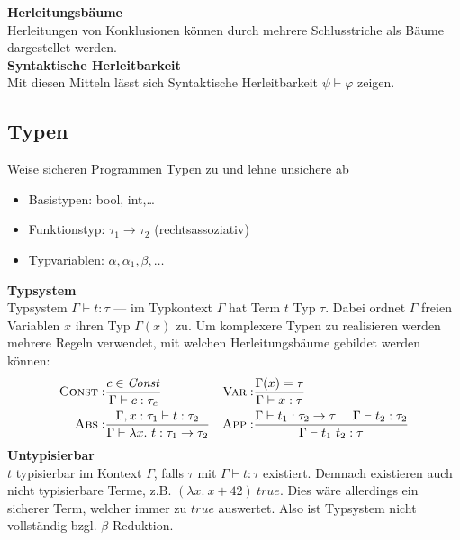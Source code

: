 \textbf{Herleitungsbäume}\\
Herleitungen von Konklusionen können durch mehrere Schlusstriche als Bäume dargestellet werden.\\

\textbf{Syntaktische Herleitbarkeit}\\
Mit diesen Mitteln lässt sich Syntaktische Herleitbarkeit \(\psi \vdash \varphi\) zeigen.

\subsection{Typen}%
\label{tg:sub:typen}
Weise sicheren Programmen Typen zu und lehne unsichere ab
\begin{itemize}
  \item Basistypen: bool, int,\ldots
  \item Funktionstyp: \(\tau_1 \rightarrow \tau_2\) (rechtsassoziativ)
  \item Typvariablen: \(\alpha, \alpha_1, \beta,\ldots \)
\end{itemize}
\textbf{Typsystem}\\
Typsystem \(\Gamma \vdash t: \tau\) --- im Typkontext \(\Gamma\) hat Term \(t\) Typ \(\tau\). Dabei ordnet \(\Gamma\)
freien Variablen \(x\) ihren Typ \(\Gamma(x)\) zu.
Um komplexere Typen zu realisieren werden mehrere Regeln verwendet, mit welchen Herleitungsbäume gebildet werden können:\\
\begin{align*}
  \textsc{Const}:& \frac{c \in \mathit{Const}}{\Gamma \vdash c: \tau_c} &
  \textsc{Var}:&   \frac{\Gamma(x) = \tau}{\Gamma \vdash x: \tau}\\
  \textsc{Abs}:&   \frac{\Gamma, x: \tau_1 \vdash t: \tau_2}{\Gamma \vdash \lambda x.\ t: \tau_1 \rightarrow \tau_2} &
  \textsc{App}:&   \frac{\Gamma \vdash t_1: \tau_2 \rightarrow \tau \ \ \ \ \Gamma \vdash t_2: \tau_2}{\Gamma \vdash t_1\ t_2: \tau}                                                                                                                      
\end{align*}
\textbf{Untypisierbar}\\
\(t\) typisierbar im Kontext \(\Gamma\), falls \(\tau\) mit \(\Gamma \vdash t: \tau\) existiert.
Demnach existieren auch nicht typisierbare Terme, z.B. \((\lambda x.\ x + 42)\ \mathit{true}\).
Dies wäre allerdings ein sicherer Term, welcher immer zu \(\mathit{true}\) auswertet. Also ist Typsystem nicht vollständig
bzgl. \(\beta\)-Reduktion.

